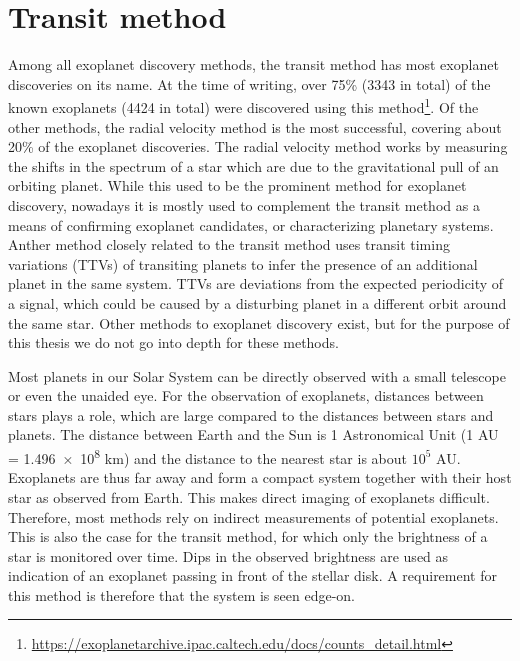 
\section{Transit method}
\label{sec:transit}


Among all exoplanet discovery methods, the transit method has most exoplanet discoveries on its name. At the time of writing, over 75\% (3343 in total) of the known exoplanets (4424 in total) were discovered using this method\footnote{\url{https://exoplanetarchive.ipac.caltech.edu/docs/counts_detail.html}}. Of the other methods, the radial velocity method is the most successful, covering about 20\% of the exoplanet discoveries. The radial velocity method works by measuring the shifts in the spectrum of a star which are due to the gravitational pull of an orbiting planet. While this used to be the prominent method for exoplanet discovery, nowadays it is mostly used to complement the transit method as a means of confirming exoplanet candidates, or characterizing planetary systems. Anther method closely related to the transit method uses transit timing variations (TTVs) of transiting planets to infer the presence of an additional planet in the same system. TTVs are deviations from the expected periodicity of a signal, which could be caused by a disturbing planet in a different orbit around the same star. Other methods to exoplanet discovery exist, but for the purpose of this thesis we do not go into depth for these methods.

Most planets in our Solar System can be directly observed with a small telescope or even the unaided eye. For the observation of exoplanets, distances between stars plays a role, which are large compared to the distances between stars and planets. The distance between Earth and the Sun is 1 Astronomical Unit (1 AU = \num{1.496e8} km) and the distance to the nearest star is about $10^5$ AU. Exoplanets are thus far away and form a compact system together with their host star as observed from Earth. This makes direct imaging of exoplanets difficult. Therefore, most methods rely on indirect measurements of potential exoplanets. This is also the case for the transit method, for which only the brightness of a star is monitored over time. Dips in the observed brightness are used as indication of an exoplanet passing in front of the stellar disk. A requirement for this method is therefore that the system is seen edge-on. 

